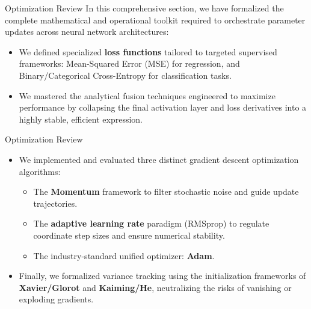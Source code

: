 \begin{frame}{Optimization Review}
	In this comprehensive section, we have formalized the complete mathematical and operational toolkit required to orchestrate parameter updates across neural network architectures:
	\begin{itemize}
		\item We defined specialized \textbf{loss functions} tailored to targeted supervised frameworks: Mean-Squared Error (MSE) for regression, and Binary/Categorical Cross-Entropy for classification tasks.
		\item We mastered the analytical fusion techniques engineered to maximize performance by collapsing the final activation layer and loss derivatives into a highly stable, efficient expression.
	\end{itemize}
\end{frame}

\begin{frame}{Optimization Review}
	\begin{itemize}
		\item We implemented and evaluated three distinct gradient descent optimization algorithms:
		\begin{itemize}
			\item The \textbf{Momentum} framework to filter stochastic noise and guide update trajectories.
			\item The \textbf{adaptive learning rate} paradigm (RMSprop) to regulate coordinate step sizes and ensure numerical stability.
			\item The industry-standard unified optimizer: \textbf{Adam}.
		\end{itemize}
		\item Finally, we formalized variance tracking using the initialization frameworks of \textbf{Xavier/Glorot} and \textbf{Kaiming/He}, neutralizing the risks of vanishing or exploding gradients.
	\end{itemize}
\end{frame}